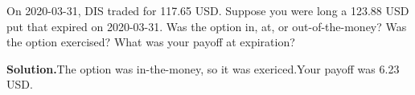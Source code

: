 \noindent On 2020-03-31, DIS traded for 117.65 USD. Suppose you were long a 123.88 USD put that expired on 2020-03-31. Was the option in, at, or out-of-the-money? Was the option exercised? What was your payoff at expiration?

\vspace{9pt} 

\textbf{Solution.}The option was in-the-money, so it was exericed.Your payoff was 6.23 USD.